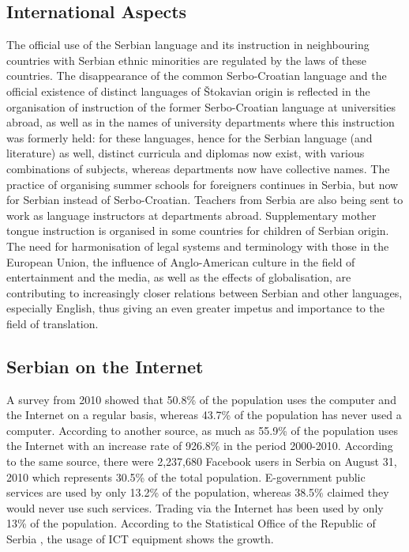 {\begin{multicols}{2}
 \subsection {International Aspects}
    
The official use of the Serbian language and its instruction in neighbouring countries with Serbian ethnic minorities are regulated by the laws of these countries. 
The disappearance of the common Serbo-Croatian language and the official existence of distinct languages of Štokavian origin is reflected in the organisation of instruction of the former Serbo-Croatian language at universities abroad, as well as in the names of university departments where this instruction was formerly held: for these languages, hence for the Serbian language (and literature) as well, distinct curricula and diplomas now exist, with various combinations of subjects, whereas departments now have collective names.
The practice of organising summer schools for foreigners continues in Serbia, but now for Serbian instead of Serbo-Croatian. Teachers from Serbia are also being sent to work as language instructors at departments abroad. 
Supplementary mother tongue instruction is organised in some countries for children of Serbian origin. 
The need for harmonisation of legal systems and terminology with those in the European Union, the influence of Anglo-American culture in the field of entertainment and the media, as well as the effects of globalisation, are contributing to increasingly closer relations between Serbian and other languages, especially English, thus giving an even greater impetus and importance to the field of translation.
 
 \subsection {Serbian on the Internet}

A survey \cite{PKEY204} from 2010 showed that 50.8\% of the population uses the computer and the Internet on a regular basis, whereas 43.7\% of the population has never used a computer. According to another source, \cite{EUROPA2} as much as 55.9\% of the population uses the Internet with an increase rate of 926.8\% in the period 2000-2010. According to the same source, there were 2,237,680 Facebook users in Serbia on August 31, 2010 which represents 30.5\% of the total population. E-government public services are used by only 13.2\% of the population, whereas 38.5\% claimed they would never use such services. Trading via the Internet has been used by only 13\% of the population.  According to the Statistical Office of the Republic of Serbia \cite{WEBRZS}, the usage of ICT equipment shows the growth.


\end{multicols}}
